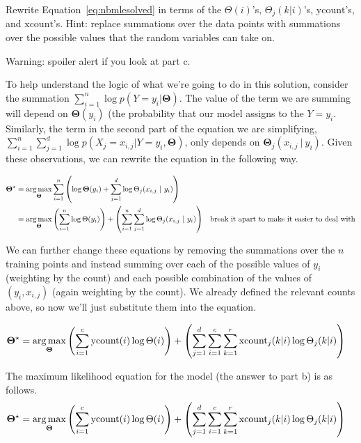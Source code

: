 \documentclass[assignment04_Solutions]{subfiles}
\begin{document}
\begin{exercise}[(60 minutes)]
Rewrite Equation~\ref{eq:nbmlesolved} in terms of the $\Theta(i)$'s, $\Theta_{j}(k|i)$'s, $\mbox{ycount}$'s, and $\mbox{xcount}$'s.  Hint: replace summations over the data points with summations over the possible values that the random variables can take on.

Warning: spoiler alert if you look at part c.
\begin{boxedsolution}
To help understand the logic of what we're going to do in this solution, consider the summation $\sum_{i=1}^n  \log p(Y = y_i  | \mathbf{\Theta})$.  The value of the term we are summing will depend on $\mathbf{\Theta}(y_i)$ (the probability that our model assigns to the $Y=y_i$.  Similarly, the term in the second part of the equation we are simplifying,  $\sum_{i=1}^n  \sum_{j=1}^d \log p(X_j = x_{i,j} | Y = y_i,  \mathbf{\Theta})$, only depends on $\mathbf{\Theta}_j(x_{i,j}~|~y_i)$.  Given these observations, we can rewrite the equation in the following way.

\begin{align}
\mathbf{\Theta^\star} &= \operatorname*{arg\,max}_{\mathbf{\Theta}} \sum_{i=1}^n  \left ( \log  \mathbf{\Theta}(y_i)  + \sum_{j=1}^d \log \Theta_j(x_{i,j}~|~y_i) \right ) \nonumber \\
&=  \operatorname*{arg\,max}_{\mathbf{\Theta}} \left ( \sum_{i=1}^n \log  \Theta(y_i) \right) + \left ( \sum_{i=1}^n  \sum_{j=1}^d \log \Theta_j(x_{i,j}~|~y_i) \right)  &\mbox{break it apart to make it easier to deal with} \nonumber
\end{align}

We can further change these equations by removing the summations over the $n$ training points and instead summing over each of the possible values of $y_i$ (weighting by the count) and each possible combination of the values of $(y_i, x_{i,j})$ (again weighting by the count). We already defined the relevant counts above, so now we'll just substitute them into the equation.

\begin{align}
\mathbf{\Theta}^\star &= \operatorname*{arg\,max}_{\mathbf{\Theta}} \left ( \sum_{i=1}^c \mbox{ycount}(i) \log \Theta(i)  \right) +  \left ( \sum_{j=1}^d \sum_{i=1}^c \sum_{k=1}^r \mbox{xcount}_j(k|i) \log \Theta_j(k|i) \right )
\end{align}
\end{boxedsolution}

\item The maximum likelihood equation for the model (the answer to part b) is as follows.
\begin{align}
\mathbf{\Theta}^\star &= \operatorname*{arg\,max}_{\mathbf{\Theta}} \left ( \sum_{i=1}^c \mbox{ycount}(i) \log \Theta(i)  \right) +  \left ( \sum_{j=1}^d \sum_{i=1}^c \sum_{k=1}^r \mbox{xcount}_j(k|i) \log \Theta_j(k|i) \right ) \label{eq:mleparameterized}
\end{align}


\end{exercise}
\end{document}
